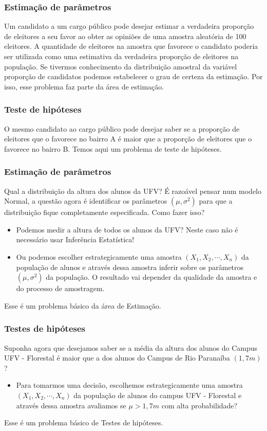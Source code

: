 \documentclass[14pt,aspectratio=1610]{beamer}
\begin{document}
\begin{frame}{}
\frametitle{Estimação de parâmetros}
\begin{block}{}
\justifying
 Um candidato a um cargo público pode desejar estimar a verdadeira proporção de eleitores 
 a seu favor ao obter as opiniões de uma amostra aleatória de 100 eleitores. A quantidade 
 de eleitores na amostra que favorece o candidato poderia ser utilizada como uma 
 estimativa da verdadeira proporção de eleitores na população. Se tivermos conhecimento 
 da distribuição amostral da variável proporção de candidatos podemos estabelecer o 
 grau de certeza da estimação. Por isso, esse problema faz parte da área de estimação.
 \end{block}
\end{frame}

\begin{frame}{}
\frametitle{Teste de hipóteses}
\begin{block}{}
\justifying
 O mesmo candidato ao cargo público pode desejar saber se a proporção de eleitores que 
 o favorece no bairro A é maior que a proporção de eleitores que o favorece no bairro B. 
 Temos aqui um problema de teste de hipóteses.
 \end{block}
\end{frame}

\begin{frame}{}
\frametitle{Estimação de parâmetros}
\begin{block}{}
\justifying
Qual a distribuição da altura dos alunos da UFV? É razoável pensar num modelo Normal, a
questão agora é identificar os parâmetros $(\mu,\sigma^{2})$ para que a distribuição 
fique completamente especificada. Como fazer isso?
\begin{itemize}
\item Podemos medir a altura de todos os alunos da UFV? Neste caso não é necessário usar 
Inferência Estatística!\pause
 \item Ou podemos escolher estrategicamente uma amostra $(X_{1},X_{2},\cdots, X_{n})$ da 
população de alunos e através dessa amostra inferir sobre os parâmetros 
$(\mu,\sigma^{2})$ da população. O resultado vai depender da qualidade da amostra e do processo de amostragem. 
\end{itemize}
Esse é um problema básico da área de Estimação.
 \end{block}
\end{frame}

\begin{frame}{}
\frametitle{Testes de hipóteses}
\begin{block}{}
Suponha agora que desejamos saber se a média da altura dos alunos do Campus UFV - Florestal é maior que a dos alunos do Campus de Rio Paranaíba $(1,7m)$?
\begin{itemize}
\item Para tomarmos uma decisão, escolhemos estrategicamente uma amostra 
 $(X_{1},X_{2},\cdots, X_{n})$ da população de alunos do campus UFV - Florestal e através dessa amostra avaliamos se $\mu>1,7m$ com alta probabilidade?
\end{itemize}
Esse é um problema básico de Testes de hipóteses.
 \end{block}
\end{frame}
\end{document}
